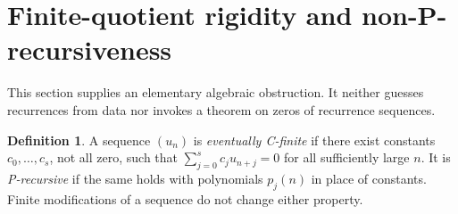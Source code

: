 \documentclass[11pt,letterpaper]{article}
\numberwithin{equation}{section}
\theoremstyle{definition}
\newtheorem{definition}[definition]{Definition}
\theoremstyle{remark}
\begin{document}
\section{Finite-quotient rigidity and non-P-recursiveness}\label{sec:rigidity}
This section supplies an elementary algebraic obstruction. It neither guesses recurrences from data nor invokes a theorem on zeros of recurrence sequences.

\begin{definition}
A sequence $(u_n)$ is \emph{eventually C-finite} if there exist constants $c_0,\ldots,c_s$, not all zero, such that
$\sum_{j=0}^s c_j u_{n+j}=0$ for all sufficiently large $n$. It is \emph{P-recursive} if the same holds with polynomials $p_j(n)$ in place of constants. Finite modifications of a sequence do not change either property.
\end{definition}
\end{document}
